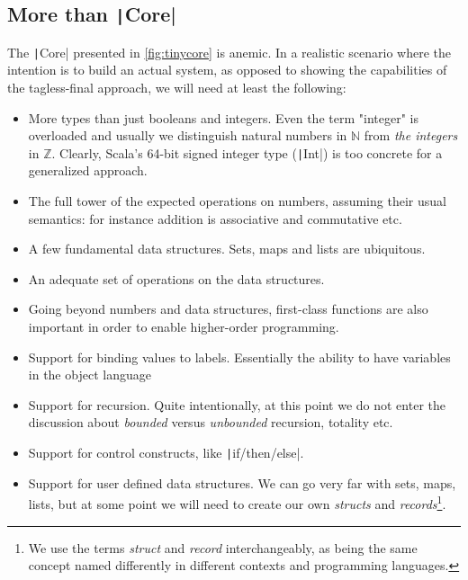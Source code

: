 \documentclass[11pt]{article}
\renewcommand{\vref}[1]{\autoref{#1} \vpageref{#1}}{}
\newcommand{\ScalaI}[1]{\texttt|#1|}
\newcommand{\TextI}[1]{\texttt|#1|}
\begin{document}
\subsection{More than \ScalaI{Core}}

The \ScalaI{Core} presented in \vref{fig:tinycore} is anemic. In a realistic scenario where the intention is to build an actual system, as opposed to showing the capabilities of the tagless-final approach, we will need at least the following:
\begin{itemize}
  \item More types than just booleans and integers. Even the term "integer" is overloaded and usually we distinguish natural numbers in $\mathbb{N}$ from \textit{the integers} in $\mathbb{Z}$. Clearly, Scala's 64-bit signed integer type (\ScalaI{Int}) is too concrete for a generalized approach.
  \item The full tower of the expected operations on numbers, assuming their usual semantics: for instance addition is associative and commutative etc.
  \item A few fundamental data structures. Sets, maps and lists are ubiquitous.
  \item An adequate set of operations on the data structures.
  \item Going beyond numbers and data structures, first-class functions are also important in order to enable higher-order programming.
  \item Support for binding values to labels. Essentially the ability to have variables in the object language
  \item Support for recursion. Quite intentionally, at this point we do not enter the discussion about \textit{bounded} versus \textit{unbounded} recursion, totality etc.
  \item Support for control constructs, like \TextI{if/then/else}.
  \item Support for user defined data structures. We can go very far with sets, maps, lists, but at some point we will need to create our own \textit{structs} and \textit{records}\footnote{We use the terms \textit{struct} and \textit{record} interchangeably, as being the same concept named differently in different contexts and programming languages.}.
\end{itemize}
\end{document}

